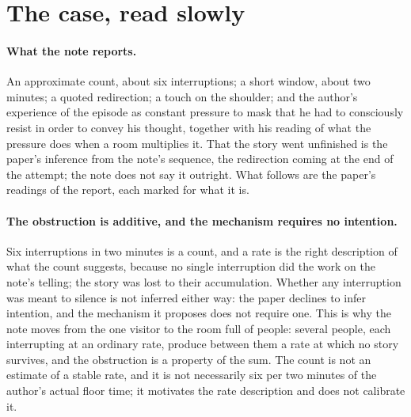 
\section{The case, read slowly}\label{sec:case}

\paragraph{What the note reports.} An approximate count, about six interruptions; a short window, about two minutes; a quoted redirection; a touch on the shoulder; and the author's experience of the episode as constant pressure to mask that he had to consciously resist in order to convey his thought, together with his reading of what the pressure does when a room multiplies it. That the story went unfinished is the paper's inference from the note's sequence, the redirection coming at the end of the attempt; the note does not say it outright. What follows are the paper's readings of the report, each marked for what it is.

\paragraph{The obstruction is additive, and the mechanism requires no intention.} Six interruptions in two minutes is a count, and a rate is the right description of what the count suggests, because no single interruption did the work on the note's telling; the story was lost to their accumulation. Whether any interruption was meant to silence is not inferred either way: the paper declines to infer intention, and the mechanism it proposes does not require one. This is why the note moves from the one visitor to the room full of people: several people, each interrupting at an ordinary rate, produce between them a rate at which no story survives, and the obstruction is a property of the sum. The count is not an estimate of a stable rate, and it is not necessarily six per two minutes of the author's actual floor time; it motivates the rate description and does not calibrate it.

